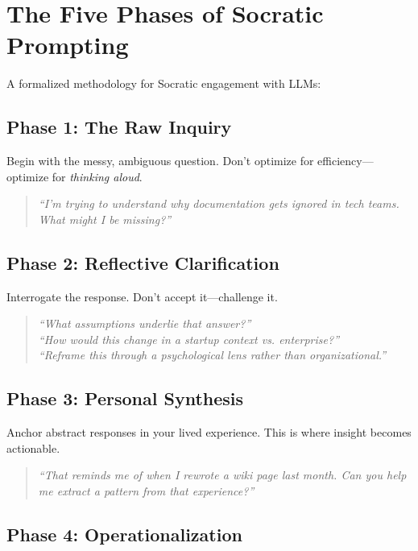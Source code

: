 \chapter{The Five Phases of Socratic Prompting}

A formalized methodology for Socratic engagement with LLMs:

\section{Phase 1: The Raw Inquiry}

Begin with the messy, ambiguous question. Don't optimize for efficiency---optimize for \emph{thinking aloud}.

\begin{quote}
\emph{``I'm trying to understand why documentation gets ignored in tech teams. What might I be missing?''}
\end{quote}

\section{Phase 2: Reflective Clarification}

Interrogate the response. Don't accept it---challenge it.

\begin{quote}
\emph{``What assumptions underlie that answer?''} \\
\emph{``How would this change in a startup context vs. enterprise?''} \\
\emph{``Reframe this through a psychological lens rather than organizational.''}
\end{quote}

\section{Phase 3: Personal Synthesis}

Anchor abstract responses in your lived experience. This is where insight becomes actionable.

\begin{quote}
\emph{``That reminds me of when I rewrote a wiki page last month. Can you help me extract a pattern from that experience?''}
\end{quote}

\section{Phase 4: Operationalization}


